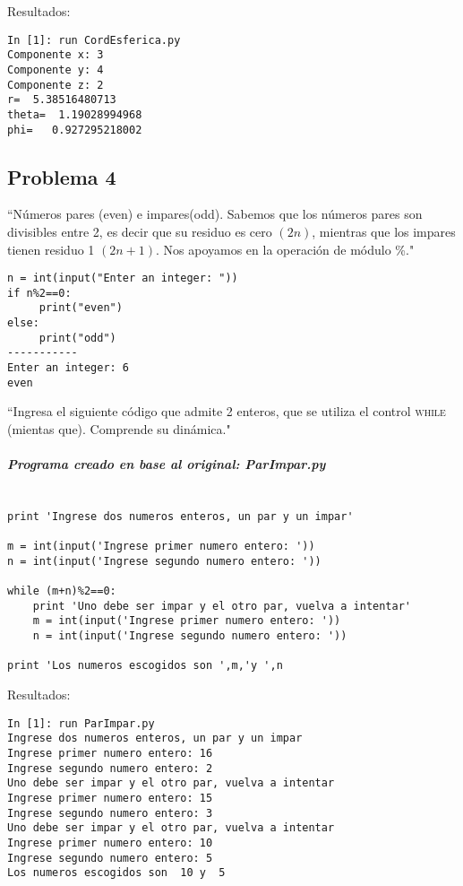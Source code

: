 \documentclass[12pt]{article}
\begin{document}
Resultados:
\begin{verbatim}
In [1]: run CordEsferica.py
Componente x: 3
Componente y: 4
Componente z: 2
r=  5.38516480713
theta=  1.19028994968
phi=   0.927295218002
\end{verbatim}

\subsection{Problema 4}

``Números pares (even) e impares(odd). Sabemos que los números pares son divisibles entre 2, es decir que su residuo es cero $(2n)$, mientras que los impares tienen residuo 1 $(2n+1)$. Nos apoyamos en la operación de módulo \%."\cite{act}

\begin{verbatim}
n = int(input("Enter an integer: "))
if n%2==0:
     print("even")
else:
     print("odd")
-----------     
Enter an integer: 6
even
\end{verbatim}

``Ingresa el siguiente código que admite 2 enteros, que se utiliza el control \textsc{while} (mientas que). Comprende su dinámica."

\subparagraph*{Programa creado en base al original: ParImpar.py}
\begin{verbatim}

print 'Ingrese dos numeros enteros, un par y un impar'

m = int(input('Ingrese primer numero entero: '))
n = int(input('Ingrese segundo numero entero: '))

while (m+n)%2==0:
    print 'Uno debe ser impar y el otro par, vuelva a intentar'
    m = int(input('Ingrese primer numero entero: '))
    n = int(input('Ingrese segundo numero entero: '))

print 'Los numeros escogidos son ',m,'y ',n
\end{verbatim}
Resultados:
\begin{verbatim}
In [1]: run ParImpar.py
Ingrese dos numeros enteros, un par y un impar
Ingrese primer numero entero: 16
Ingrese segundo numero entero: 2
Uno debe ser impar y el otro par, vuelva a intentar
Ingrese primer numero entero: 15
Ingrese segundo numero entero: 3
Uno debe ser impar y el otro par, vuelva a intentar
Ingrese primer numero entero: 10
Ingrese segundo numero entero: 5
Los numeros escogidos son  10 y  5
\end{verbatim}

\pagebreak
\end{document}
